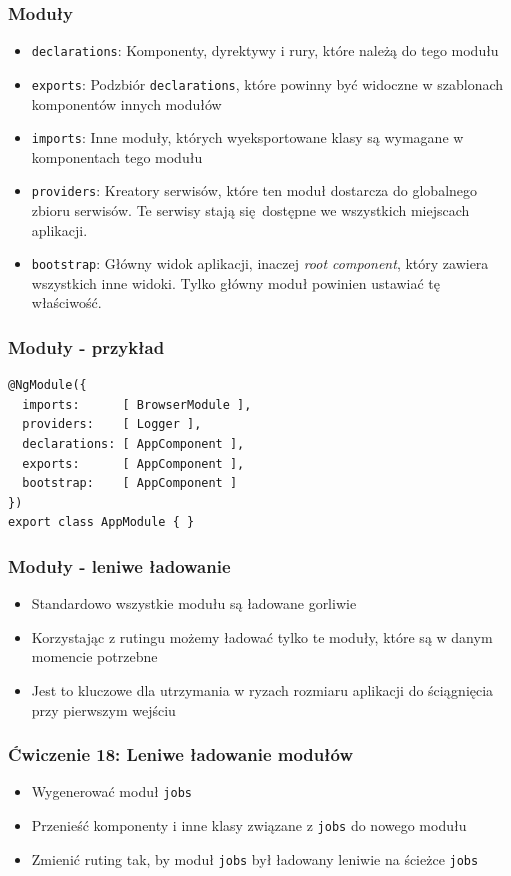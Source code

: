 \documentclass{beamer}
\begin{document}
\begin{frame}
    \frametitle{Moduły}
    \begin{itemize}
        \item \lstinline{declarations}: Komponenty, dyrektywy i rury, które należą do tego modułu
        \item \lstinline{exports}: Podzbiór \lstinline{declarations}, które powinny być widoczne w szablonach komponentów innych modułów
        \item \lstinline{imports}: Inne moduły, których wyeksportowane klasy są wymagane w komponentach tego modułu
        \item \lstinline{providers}: Kreatory serwisów, które ten moduł dostarcza do globalnego zbioru serwisów. Te serwisy stają się dostępne we wszystkich miejscach aplikacji.
        \item \lstinline{bootstrap}: Główny widok aplikacji, inaczej \textit{root component}, który zawiera wszystkich inne widoki. Tylko główny moduł powinien ustawiać tę właściwość.
    \end{itemize}
\end{frame}

\begin{frame}[fragile]
    \frametitle{Moduły - przykład}
\begin{lstlisting}
@NgModule({
  imports:      [ BrowserModule ],
  providers:    [ Logger ],
  declarations: [ AppComponent ],
  exports:      [ AppComponent ],
  bootstrap:    [ AppComponent ]
})
export class AppModule { }
\end{lstlisting}
\end{frame}

\begin{frame}
    \frametitle{Moduły - leniwe ładowanie}
    \begin{itemize}
        \item Standardowo wszystkie modułu są ładowane gorliwie
        \item Korzystając z rutingu możemy ładować tylko te moduły, które są w danym momencie potrzebne
        \item Jest to kluczowe dla utrzymania w ryzach rozmiaru aplikacji do ściągnięcia przy pierwszym wejściu
    \end{itemize}
\end{frame}

\begin{frame}
    \frametitle{Ćwiczenie 18: Leniwe ładowanie modułów}
    \begin{itemize}
        \item Wygenerować moduł \lstinline{jobs}
        \item Przenieść komponenty i inne klasy związane z \lstinline{jobs} do nowego modułu
        \item Zmienić ruting tak, by moduł \lstinline{jobs} był ładowany leniwie na ścieżce \lstinline{jobs}
    \end{itemize}
\end{frame}
\end{document}
